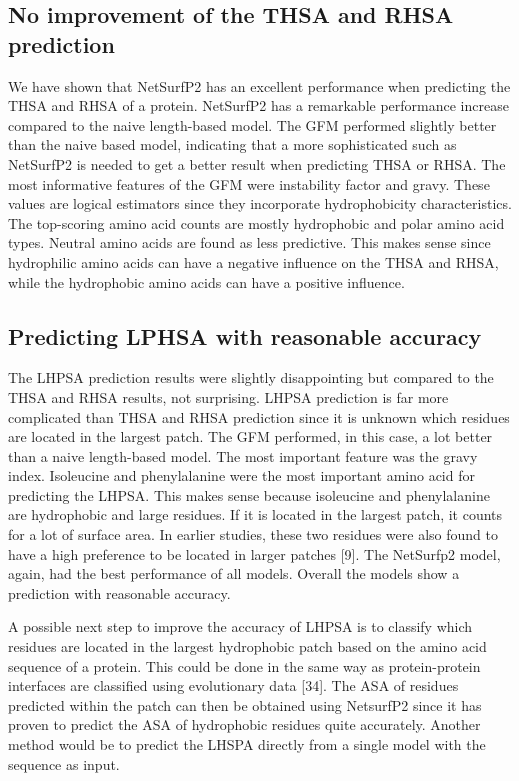 \documentclass[11pt,a4paper]{article}
\begin{document}
\subsection{No improvement of the THSA and RHSA prediction}
We have shown that NetSurfP2 has an excellent performance when predicting the THSA and RHSA of a protein. NetSurfP2 has a remarkable performance increase compared to the naive length-based model. The GFM performed slightly better than the naive based model, indicating that a more sophisticated such as NetSurfP2 is needed to get a better result when predicting THSA or RHSA. The most informative features of the GFM were instability factor and gravy. These values are logical estimators since they incorporate hydrophobicity characteristics. The top-scoring amino acid counts are mostly hydrophobic and polar amino acid types.  Neutral amino acids are found as less predictive. This makes sense since hydrophilic amino acids can have a negative influence on the THSA and RHSA, while the hydrophobic amino acids can have a positive influence.

\subsection{Predicting LPHSA with reasonable accuracy}
	
The LHPSA prediction results were slightly disappointing but compared to the THSA and RHSA results, not surprising. LHPSA prediction is far more complicated than THSA and RHSA prediction since it is unknown which residues are located in the largest patch. The GFM performed, in this case, a lot better than a naive length-based model. The most important feature was the gravy index. Isoleucine and phenylalanine were the most important amino acid for predicting the LHPSA. This makes sense because isoleucine and phenylalanine are hydrophobic and large residues. If it is located in the largest patch, it counts for a lot of surface area. In earlier studies, these two residues were also found to have a high preference to be located in larger patches [9]. The NetSurfp2 model, again,  had the best performance of all models. Overall the models show a prediction with reasonable accuracy. 

A possible next step to improve the accuracy of LHPSA is to classify which residues are located in the largest hydrophobic patch based on the amino acid sequence of a protein. This could be done in the same way as protein-protein interfaces are classified using evolutionary data [34]. The ASA of residues predicted within the patch can then be obtained using NetsurfP2 since it has proven to predict the ASA of hydrophobic residues quite accurately. Another method would be to predict the LHSPA directly from a single model with the sequence as input.
\end{document}
